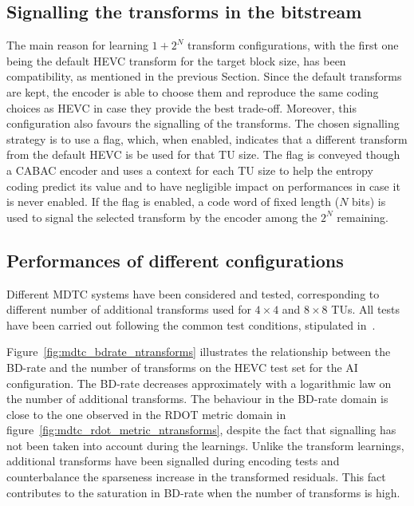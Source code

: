\documentclass[11pt,a4paper,openright,twoside]{book}
\numberwithin{equation}{section} %
\numberwithin{figure}{section} %
\numberwithin{table}{section} %
\begin{document}
\subsection{Signalling the transforms in the bitstream}
\label{sub:mdtc_signalling}

The main reason for learning $1+2^N$ transform configurations, with the first
one being the default \ac{HEVC} transform for the target block size, has been
compatibility, as mentioned in the previous Section.
Since the default transforms are kept, the encoder is able to choose them and
reproduce the same coding choices as \ac{HEVC} in case they provide the best
trade-off.
Moreover, this configuration also favours the signalling of the transforms.
The chosen signalling strategy is to use a flag, which, when enabled,
indicates that a different transform from the default \ac{HEVC} is be used for
that \ac{TU} size.
The flag is conveyed though a \ac{CABAC} encoder and uses a context for each
\ac{TU} size to help the entropy coding predict its value and to have
negligible impact on performances in case it is never enabled.
If the flag is enabled, a code word of fixed length ($N$ bits) is used to
signal the selected transform by the encoder among the $2^N$ remaining.

\subsection{Performances of different configurations}
\label{sub:mdtc_performances}

Different \ac{MDTC} systems have been considered and tested, corresponding to
different number of additional transforms used for $4\times4$ and $8\times8$
\acp{TU}.
All tests have been carried out following the common test conditions,
stipulated in~\cite{bossen-12-common-test-conditions}.

Figure~\ref{fig:mdtc_bdrate_ntransforms} illustrates the relationship between
the \ac{BD}-rate and the number of transforms on the \ac{HEVC} test set for
the \ac{AI} configuration.
The \ac{BD}-rate decreases approximately with a logarithmic law on the number
of additional transforms.
The behaviour in the \ac{BD}-rate domain is close to the one observed in the
\ac{RDOT} metric domain in figure~\ref{fig:mdtc_rdot_metric_ntransforms},
despite the fact that signalling has not been taken into account during the
learnings.
Unlike the transform learnings, additional transforms have been signalled
during encoding tests and counterbalance the sparseness increase in the
transformed residuals.
This fact contributes to the saturation in \ac{BD}-rate when the number of
transforms is high.
\end{document}
